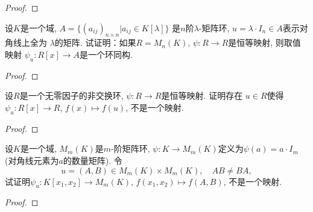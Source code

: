 \begin{proof}
    
\end{proof}

\begin{problem}
    设$K$是一个域, $A = \{(a_{ij})_{n \times n}|a_{ij} \in K[\lambda]\}$
是$n$阶$\lambda$-矩阵环, $u = \lambda \cdot I_n \in A$表示对角线上全为
$\lambda$的矩阵. 试证明：如果$R = M_n(K),\, \psi:R \to R$是恒等映射, 则取值映射
$\psi_u:R[x] \to A$是一个环同构.
\end{problem}

\begin{proof}
    
\end{proof}

\begin{problem}
    设$R$是一个无零因子的非交换环, $\psi:R \to R$是恒等映射. 证明存在
$u \in R$使得$\psi _u:R[x] \to R$, $f(x) \mapsto f(u)$,
不是一个映射.
\end{problem}

\begin{proof}
    
\end{proof}

\begin{problem}
    设$K$是一个域, $M_m(K)$是$m$-阶矩阵环,
$\psi:K \to M_m(K)$定义为$\psi(a) = a \cdot I_{m}$
(对角线元素为$a$的数量矩阵). 令
\[
    u = (A, B) \in M_m(K) \times M_m(K),\quad AB \neq BA,
\]
试证明$\psi_u:K[x_1, x_2] \to M_m(K),\, f(x_1, x_2) \mapsto f(A, B)$,
不是一个映射.
\end{problem}

\begin{proof}
    
\end{proof}